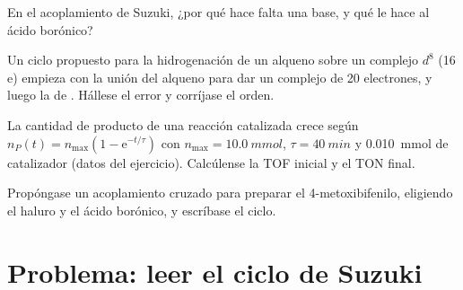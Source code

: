 \begin{exercise}[$\star\star$]\label{exo:b2:catalytic-cycles:9}
En el acoplamiento de Suzuki, ¿por qué hace falta una base, y qué le hace al ácido borónico?
\end{exercise}

\begin{exercise}[$\star\star\star$]\label{exo:b2:catalytic-cycles:10}
Un ciclo propuesto para la hidrogenación de un alqueno sobre un complejo $d^8$  (16 e)
empieza con la unión del alqueno para dar un complejo de 20 electrones, y luego la 
de . Hállese el error y corríjase el orden.
\end{exercise}

\begin{exercise}[$\star\star\star$]\label{exo:b2:catalytic-cycles:11}
La cantidad de producto de una reacción catalizada crece según $n_P(t) = n_{\max}(1 - \mathrm e^{-t/\tau})$
con $n_{\max} = \qty{10.0}{mmol}$, $\tau = \qty{40}{min}$ y \qty{0.010}{mmol} de catalizador
(datos del ejercicio). Calcúlense la TOF inicial y el TON final.
\end{exercise}

\begin{exercise}[$\star\star\star$]\label{exo:b2:catalytic-cycles:12}
Propóngase un acoplamiento cruzado para preparar el 4-metoxibifenilo, eligiendo el haluro y el ácido
borónico, y escríbase el ciclo.
\end{exercise}

\section{Problema: leer el ciclo de Suzuki}

